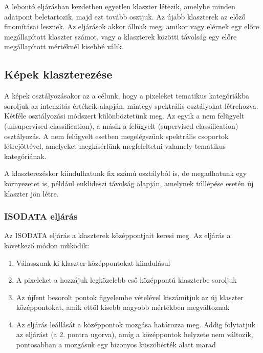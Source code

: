 \documentclass[a4paper,12pt]{article}
\begin{document}
A lebontó eljárásban kezdetben egyetlen klaszter létezik, amelybe minden
adatpont beletartozik, majd ezt tovább osztjuk. Az újabb klaszterek az előző
finomításai lesznek.  Az eljárások akkor állnak meg, amikor vagy elérnek egy
előre megállapított klaszter számot, vagy a klaszterek közötti távolság egy
előre megállapított mértéknél kisebbé válik.



\subsection{Képek klaszterezése}

A képek osztályozásakor az a célunk, hogy a pixeleket tematikus kategóriákba
soroljuk az intenzitás értékeik alapján, mintegy spektrális osztályokat
létrehozva. Kétféle osztályozási módszert különböztetünk meg. Az egyik a nem
felügyelt (unsupervised classification), a másik a felügyelt (supervised
classification) osztályozás. A nem felügyelt esetben megelégszünk spektrális
csoportok létrejöttével, amelyeket megkísérlünk megfeleltetni valamely tematikus
kategóriának.

A klaszterezéskor kiindulhatunk fix számú osztályból is, de megadhatunk egy
környezetet is, például euklideszi távolság alapján, amelynek túllépése esetén
új klaszter jön létre. 

\subsubsection{ISODATA eljárás}

Az ISODATA eljárás a klaszterek középpontjait keresi meg. Az eljárás a következő
módon működik:

\begin{enumerate}
	\item Válasszunk ki klaszter középpontokat kiindulásul
	\item A pixeleket a hozzájuk legközelebb eső középpontú klaszterbe soroljuk
	\item Az újfent besorolt pontok figyelembe vételével kiszámítjuk az új klaszter
	középpontokat, amik ettől kisebb nagyobb mértékben megváltoznak
	\item Az eljárás leállását a középpontok mozgása határozza meg. Addig folytatjuk
	az eljárást (a 2. pontra ugorva), amíg a középpontok helyzete nem változik,
	pontosabban a mozgásuk egy bizonyos küszöbérték alatt marad
\end{enumerate}
\end{document}
